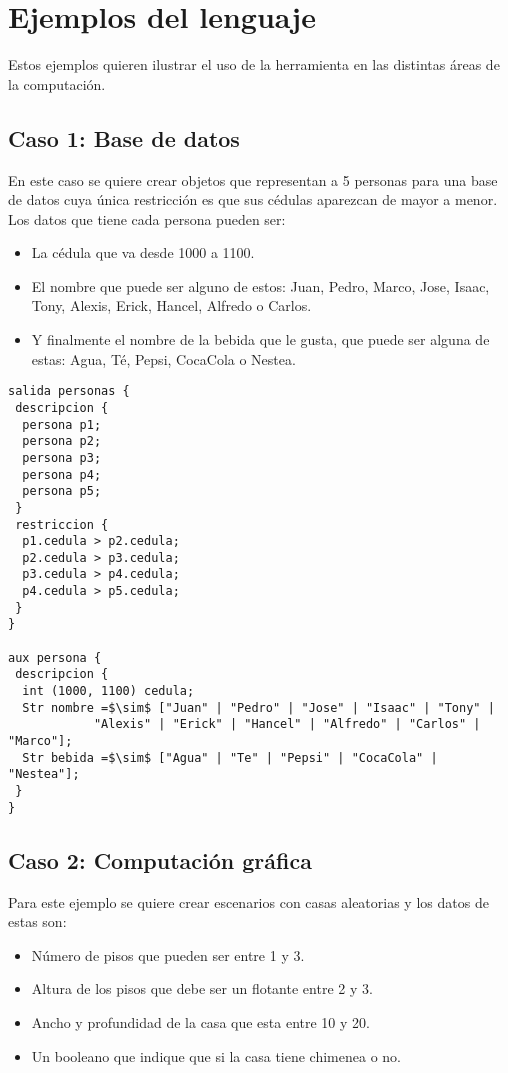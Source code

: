 \chapter{Ejemplos del lenguaje}\label{ejemplos_lenguaje}

Estos ejemplos quieren ilustrar el uso de la herramienta en las distintas áreas de la 
computación.

\section{Caso 1: Base de datos}
\label{ejemplo:bd}
En este caso se quiere crear objetos que representan a 5 personas para una base 
de datos cuya única restricción es que sus cédulas aparezcan de mayor a menor. 
Los datos que tiene cada persona pueden ser:

\begin{itemize}
\item{La cédula que va desde 1000 a 1100.}
\item{El nombre que puede ser alguno de estos: Juan, Pedro, Marco, Jose, Isaac, Tony, Alexis, Erick, Hancel, Alfredo o Carlos.}
\item{Y finalmente el nombre de la bebida que le gusta, que puede ser alguna de estas: Agua, Té, Pepsi, CocaCola o Nestea.}
\end{itemize}

\begin{lstlisting}[mathescape]
salida personas {
 descripcion {
  persona p1;
  persona p2;
  persona p3;
  persona p4;
  persona p5;
 }
 restriccion {
  p1.cedula > p2.cedula;
  p2.cedula > p3.cedula;
  p3.cedula > p4.cedula;
  p4.cedula > p5.cedula;
 }
}

aux persona {
 descripcion {
  int (1000, 1100) cedula;
  Str nombre =$\sim$ ["Juan" | "Pedro" | "Jose" | "Isaac" | "Tony" | 
            "Alexis" | "Erick" | "Hancel" | "Alfredo" | "Carlos" | "Marco"];
  Str bebida =$\sim$ ["Agua" | "Te" | "Pepsi" | "CocaCola" | "Nestea"];
 }
}
\end{lstlisting}

\section{Caso 2: Computación gráfica}
\label{ejemplo:cg}
Para este ejemplo se quiere crear escenarios con casas aleatorias y los datos de estas son:

\begin{itemize}
\item{Número de pisos que pueden ser entre 1 y 3.}
\item{Altura de los pisos que debe ser un flotante entre 2 y 3.}
\item{Ancho y profundidad de la casa que esta entre 10 y 20.}
\item{Un booleano que indique que si la casa tiene chimenea o no.}
\end{itemize}

